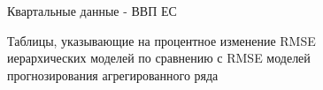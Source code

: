 \documentclass[12pt,a4paper, oneside]{extreport}
\begin{document}
\begin{figure}[H]
	\caption{Таблицы, указывающие на процентное изменение RMSE иерархических моделей по сравнению с RMSE моделей прогнозирования  агрегированного ряда   }
	\label{otkl_1}
	
	\centering\footnotesize{Квартальные данные - ВВП ЕС  }
	
	\begin{minipage}[H]{0.4\linewidth}
	\end{minipage}
		\hfill
	\begin{minipage}[H]{0.4\linewidth}
	\end{minipage}
	

\end{figure}
\end{document}
